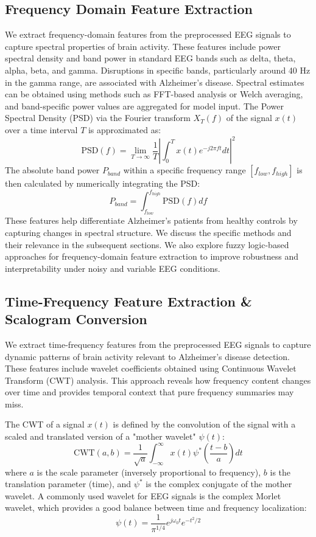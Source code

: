 \documentclass[openany]{book}
\begin{document}
\subsection{Frequency Domain Feature Extraction}
\label{subsec:freq_domain}
We extract frequency-domain features from the preprocessed EEG signals to capture spectral properties of brain activity. These features include power spectral density and band power in standard EEG bands such as delta, theta, alpha, beta, and gamma. Disruptions in specific bands, particularly around 40 Hz in the gamma range, are associated with Alzheimer's disease. Spectral estimates can be obtained using methods such as FFT-based analysis or Welch averaging, and band-specific power values are aggregated for model input. The Power Spectral Density (PSD) via the Fourier transform $X_T(f)$ of the signal $x(t)$ over a time interval $T$ is approximated as:
\begin{equation}
    \text{PSD}(f) = \lim_{T \to \infty} \frac{1}{T} \left| \int_{0}^{T} x(t) e^{-j 2\pi f t} dt \right|^2
\end{equation}
The absolute band power $P_{band}$ within a specific frequency range $[f_{low}, f_{high}]$ is then calculated by numerically integrating the PSD:
\begin{equation}
    P_{band} = \int_{f_{low}}^{f_{high}} \text{PSD}(f) df
\end{equation}
These features help differentiate Alzheimer's patients from healthy controls by capturing changes in spectral structure. We discuss the specific methods and their relevance in the subsequent sections. We also explore fuzzy logic-based approaches for frequency-domain feature extraction to improve robustness and interpretability under noisy and variable EEG conditions.
\subsection{Time-Frequency Feature Extraction \& Scalogram Conversion}
\label{subsec:time_freq}
We extract time-frequency features from the preprocessed EEG signals to capture dynamic patterns of brain activity relevant to Alzheimer's disease detection. These features include wavelet coefficients obtained using Continuous Wavelet Transform (CWT) analysis. This approach reveals how frequency content changes over time and provides temporal context that pure frequency summaries may miss.

The CWT of a signal $x(t)$ is defined by the convolution of the signal with a scaled and translated version of a "mother wavelet" $\psi(t)$:
\begin{equation}
    \text{CWT}(a, b) = \frac{1}{\sqrt{a}} \int_{-\infty}^{\infty} x(t) \psi^*\left(\frac{t-b}{a}\right) dt
\end{equation}
where $a$ is the scale parameter (inversely proportional to frequency), $b$ is the translation parameter (time), and $\psi^*$ is the complex conjugate of the mother wavelet. A commonly used wavelet for EEG signals is the complex Morlet wavelet, which provides a good balance between time and frequency localization:
\begin{equation}
    \psi(t) = \frac{1}{\pi^{1/4}} e^{j \omega_0 t} e^{-t^2 / 2}
\end{equation}
\end{document}
